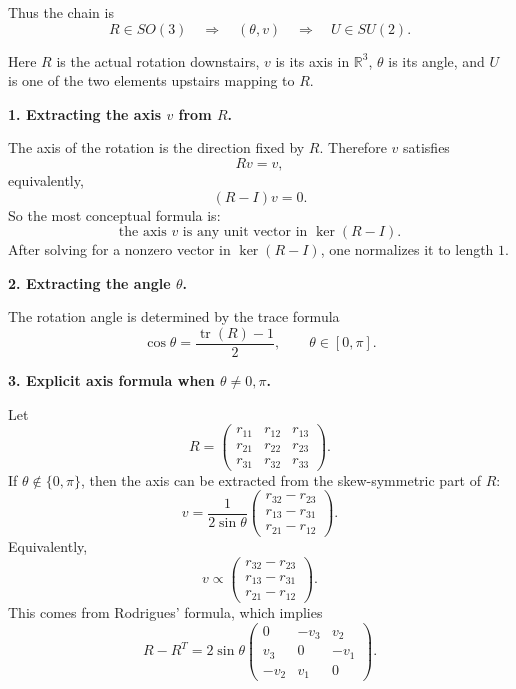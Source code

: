 \documentclass[12pt,a4paper]{article}
\theoremstyle{notespace}
\begin{document}
Thus the chain is
\[
R\in SO(3)
\quad\Longrightarrow\quad
(\theta,v)
\quad\Longrightarrow\quad
U\in SU(2).
\]

Here \(R\) is the actual rotation downstairs, \(v\) is its axis in \(\mathbb R^3\), \(\theta\) is its angle, and \(U\) is one of the two elements upstairs mapping to \(R\).

\medskip

\textbf{1. Extracting the axis \(v\) from \(R\).}

The axis of the rotation is the direction fixed by \(R\). Therefore \(v\) satisfies
\[
Rv=v,
\]
equivalently,
\[
(R-I)v=0.
\]
So the most conceptual formula is:
\[
\boxed{\text{the axis }v\text{ is any unit vector in }\ker(R-I).}
\]
After solving for a nonzero vector in \(\ker(R-I)\), one normalizes it to length \(1\).

\medskip

\textbf{2. Extracting the angle \(\theta\).}

The rotation angle is determined by the trace formula
\[
\boxed{\cos\theta=\frac{\operatorname{tr}(R)-1}{2}},
\qquad
\theta\in[0,\pi].
\]

\medskip

\textbf{3. Explicit axis formula when \(\theta\neq 0,\pi\).}

Let
\[
R=
\begin{pmatrix}
	r_{11}&r_{12}&r_{13}\\
	r_{21}&r_{22}&r_{23}\\
	r_{31}&r_{32}&r_{33}
\end{pmatrix}.
\]
If \(\theta\notin\{0,\pi\}\), then the axis can be extracted from the skew-symmetric part of \(R\):
\[
\boxed{
	v=
	\frac{1}{2\sin\theta}
	\begin{pmatrix}
		r_{32}-r_{23}\\[4pt]
		r_{13}-r_{31}\\[4pt]
		r_{21}-r_{12}
	\end{pmatrix}.
}
\]
Equivalently,
\[
\boxed{
	v\propto
	\begin{pmatrix}
		r_{32}-r_{23}\\
		r_{13}-r_{31}\\
		r_{21}-r_{12}
	\end{pmatrix}.
}
\]
This comes from Rodrigues' formula, which implies
\[
R-R^T
=
2\sin\theta
\begin{pmatrix}
	0&-v_3&v_2\\
	v_3&0&-v_1\\
	-v_2&v_1&0
\end{pmatrix}.
\]
\end{document}
